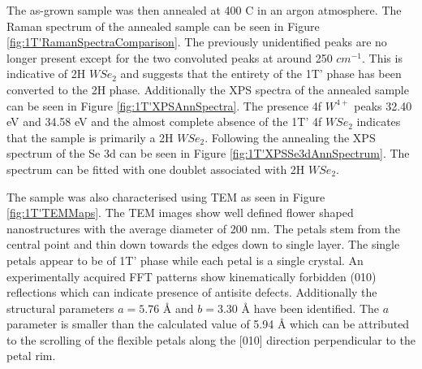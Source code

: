 The as-grown sample was then annealed at 400 {\degree}C in an argon atmosphere. The Raman spectrum of the annealed sample can be seen in Figure \ref{fig:1T'RamanSpectraComparison}. The previously unidentified peaks are no longer present except for the two convoluted peaks at around 250 $cm^{-1}$. This is indicative of 2H $WSe_2$ and suggests that the entirety of the 1T' phase has been converted to the 2H phase. Additionally the XPS spectra of the annealed sample can be seen in Figure \ref{fig:1T'XPSAnnSpectra}. The presence 4f $W^{4+}$ peaks 32.40 eV and 34.58 eV and the almost complete absence of the 1T' 4f $WSe_2$ indicates that the sample is primarily a 2H $WSe_2$. Following the annealing the XPS spectrum of the Se 3d can be seen in Figure \ref{fig:1T'XPSSe3dAnnSpectrum}. The spectrum can be fitted with one doublet associated with 2H $WSe_2$.

The sample was also characterised using TEM as seen in Figure \ref{fig:1T'TEMMaps}. The TEM images show well defined flower shaped nanostructures with the average diameter of 200 nm. The petals stem from the central point and thin down towards the edges down to single layer. The single petals appear to be of 1T' phase while each petal is a single crystal. An experimentally acquired FFT patterns show kinematically forbidden (010) reflections which can indicate presence of antisite defects. Additionally the structural parameters $a = 5.76$ \r{A} and $b = 3.30$ \r{A} have been identified. The $a$ parameter is smaller than the calculated value of 5.94 \r{A} \cite{Duerloo2014} which can be attributed to the scrolling of the flexible petals along the [010] direction perpendicular to the petal rim.

